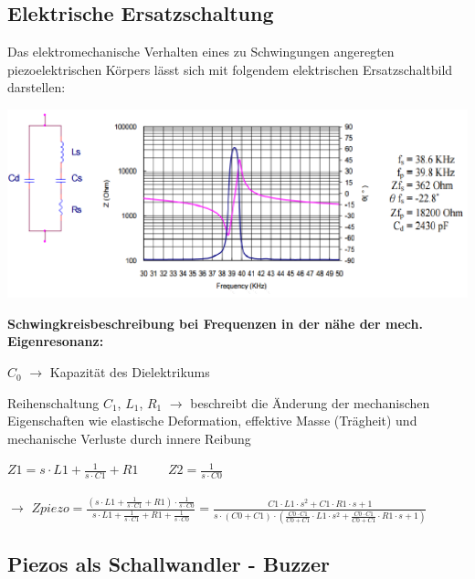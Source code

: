 \subsection{Elektrische Ersatzschaltung}
Das elektromechanische Verhalten eines zu Schwingungen angeregten piezoelektrischen Körpers lässt sich mit folgendem elektrischen Ersatzschaltbild darstellen:\\ 
\begin{minipage}{0.5\textwidth}
    \includegraphics[width=1.0\textwidth]{images/Ersatzschaltbild_Piezo}
\end{minipage}
\hfill
\begin{minipage}{0.45\textwidth}
    \textbf{Schwingkreisbeschreibung bei Frequenzen in der nähe der mech. Eigenresonanz:}
    \begin{compactitem}
        \item $C_{0}$ $\rightarrow$  Kapazität des Dielektrikums
        \item Reihenschaltung $C_{1}$, $L_{1}$, $R_{1}$ $\rightarrow$ beschreibt die Änderung
        der mechanischen Eigenschaften wie elastische Deformation, effektive Masse (Trägheit) und mechanische Verluste durch innere Reibung\\
    \end{compactitem}
    $Z1 = s\cdot L1 + \frac{1}{s\cdot C1} + R1$ \ \ \ \ $Z2 = \frac{1}{s\cdot C0}$ \\\\ $\rightarrow$ $Zpiezo = \frac{(s\cdot L1 + \frac{1}{s\cdot C1} + R1)\cdot \frac{1}{s\cdot C0}}{s\cdot L1 + \frac{1}{s\cdot C1} + R1 + \frac{1}{s\cdot C0}} = \frac{C1\cdot L1\cdot s^2 + C1\cdot R1\cdot s + 1}{s\cdot (C0+C1)\cdot (\frac{C0\cdot C1}{C0 + C1}\cdot L1\cdot s^2 + \frac{C0\cdot C1}{C0 + C1}\cdot R1\cdot s + 1)}$
\end{minipage}

\subsection{Piezos als Schallwandler - Buzzer}

